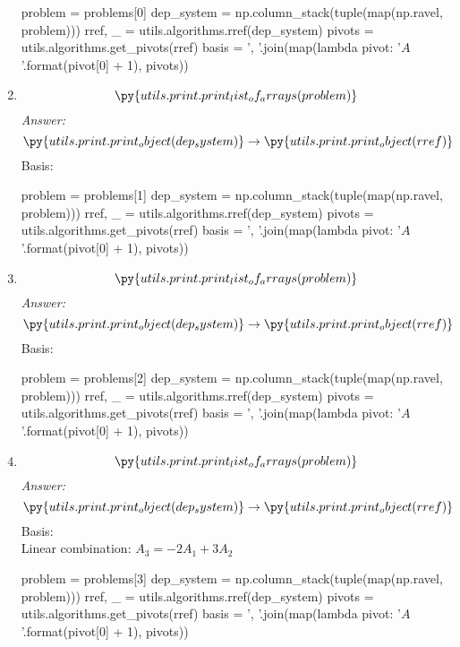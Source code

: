 \documentclass[letterpaper]{article}
\newcommand{\ans}{\textit{Answer: }}
\newenvironment{question}[2][Question]{\begin{trivlist}
\item[\hskip \labelsep {\bfseries #1}\hskip \labelsep {\bfseries #2.}]}{\end{trivlist}}
\newcommand{\printobj}[1]{\py{utils.print.print_object(#1)}}
\begin{document}
\begin{question}{2.1}
\begin{enumerate}[label=\textbf{(\alph*)}]
    \begin{pycode}
problem = problems[0]
dep_system = np.column_stack(tuple(map(np.ravel, problem)))
rref, _ = utils.algorithms.rref(dep_system)
pivots = utils.algorithms.get_pivots(rref)
basis = ', '.join(map(lambda pivot: '$A_{}$'.format(pivot[0] + 1), pivots))
    \end{pycode}
    \item
    $$\py{utils.print.print_list_of_arrays(problem)}$$
    \ans 
    $$\printobj{dep_system} \rightarrow \printobj{rref}$$
    Basis:  \\
    \begin{pycode}
problem = problems[1]
dep_system = np.column_stack(tuple(map(np.ravel, problem)))
rref, _ = utils.algorithms.rref(dep_system)
pivots = utils.algorithms.get_pivots(rref)
basis = ', '.join(map(lambda pivot: '$A_{}$'.format(pivot[0] + 1), pivots))
    \end{pycode}
    \item
    $$\py{utils.print.print_list_of_arrays(problem)}$$
    \ans 
    $$\printobj{dep_system} \rightarrow \printobj{rref}$$
    Basis:  \\ 
    \begin{pycode}
problem = problems[2]
dep_system = np.column_stack(tuple(map(np.ravel, problem)))
rref, _ = utils.algorithms.rref(dep_system)
pivots = utils.algorithms.get_pivots(rref)
basis = ', '.join(map(lambda pivot: '$A_{}$'.format(pivot[0] + 1), pivots))
    \end{pycode}
    \item
    $$\py{utils.print.print_list_of_arrays(problem)}$$
    \ans 
    $$\printobj{dep_system} \rightarrow \printobj{rref}$$
    Basis:  \\
    Linear combination: $A_3 = -2A_1 + 3A_2$ \\
    \begin{pycode}
problem = problems[3]
dep_system = np.column_stack(tuple(map(np.ravel, problem)))
rref, _ = utils.algorithms.rref(dep_system)
pivots = utils.algorithms.get_pivots(rref)
basis = ', '.join(map(lambda pivot: '$A_{}$'.format(pivot[0] + 1), pivots))
    \end{pycode}

\end{enumerate}
\end{question}
\end{document}
